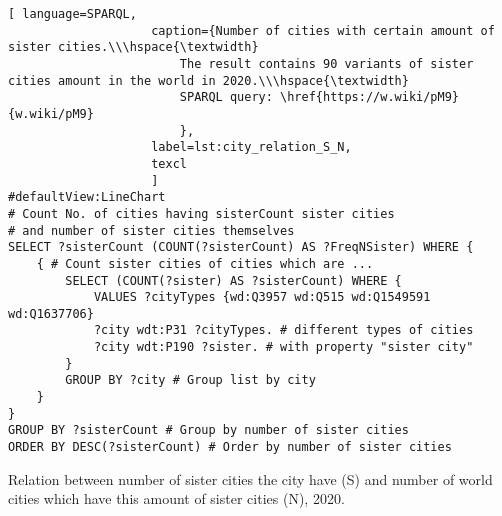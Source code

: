 \begin{lstlisting}[ language=SPARQL, 
                    caption={Number of cities with certain amount of sister cities.\\\hspace{\textwidth}
                        The result contains 90 variants of sister cities amount in the world in 2020.\\\hspace{\textwidth}
                        SPARQL query: \href{https://w.wiki/pM9}{w.wiki/pM9}
                        },
                    label=lst:city_relation_S_N,
                    texcl 
                    ]
#defaultView:LineChart
# Count No. of cities having sisterCount sister cities 
# and number of sister cities themselves
SELECT ?sisterCount (COUNT(?sisterCount) AS ?FreqNSister) WHERE {                                                                         
	{ # Count sister cities of cities which are ...
		SELECT (COUNT(?sister) AS ?sisterCount) WHERE {        
			VALUES ?cityTypes {wd:Q3957 wd:Q515 wd:Q1549591 wd:Q1637706}
			?city wdt:P31 ?cityTypes. # different types of cities
			?city wdt:P190 ?sister. # with property "sister city"
		}
		GROUP BY ?city # Group list by city
	}
}
GROUP BY ?sisterCount # Group by number of sister cities                                     
ORDER BY DESC(?sisterCount) # Order by number of sister cities 
\end{lstlisting}%


\begin{marginfigure}
{
\setlength{\fboxsep}{0pt}%
\setlength{\fboxrule}{1pt}%
}
	\caption{Relation between number of sister cities the city have (S) and number of world cities which have this amount of sister cities (N), 2020.}
\end{marginfigure}

